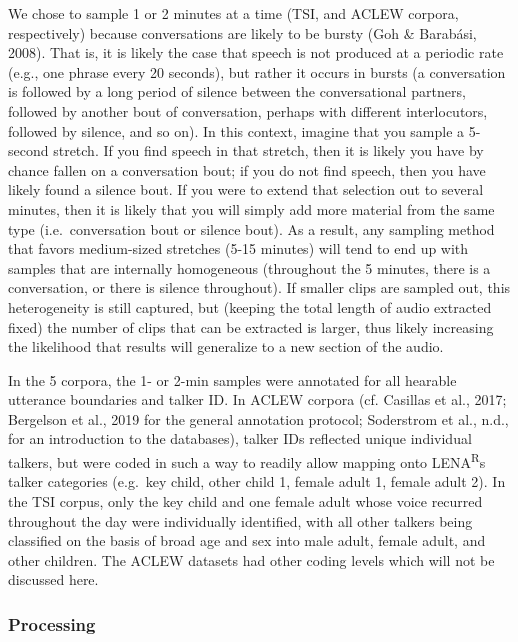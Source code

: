 \documentclass[english,table,man,floatsintext]{apa6}
\begin{document}
We chose to sample 1 or 2 minutes at a time (TSI, and ACLEW corpora, respectively) because conversations are likely to be bursty (Goh \& Barabási, 2008). That is, it is likely the case that speech is not produced at a periodic rate (e.g., one phrase every 20 seconds), but rather it occurs in bursts (a conversation is followed by a long period of silence between the conversational partners, followed by another bout of conversation, perhaps with different interlocutors, followed by silence, and so on). In this context, imagine that you sample a 5-second stretch. If you find speech in that stretch, then it is likely you have by chance fallen on a conversation bout; if you do not find speech, then you have likely found a silence bout. If you were to extend that selection out to several minutes, then it is likely that you will simply add more material from the same type (i.e.~conversation bout or silence bout). As a result, any sampling method that favors medium-sized stretches (5-15 minutes) will tend to end up with samples that are internally homogeneous (throughout the 5 minutes, there is a conversation, or there is silence throughout). If smaller clips are sampled out, this heterogeneity is still captured, but (keeping the total length of audio extracted fixed) the number of clips that can be extracted is larger, thus likely increasing the likelihood that results will generalize to a new section of the audio.

In the 5 corpora, the 1- or 2-min samples were annotated for all hearable utterance boundaries and talker ID. In ACLEW corpora (cf. Casillas et al., 2017; Bergelson et al., 2019 for the general annotation protocol; Soderstrom et al., n.d., for an introduction to the databases),
talker IDs reflected unique individual talkers, but were coded in such a way to readily allow mapping onto LENA\textsuperscript{R}s talker categories (e.g.~key child, other child 1, female adult 1, female adult 2). In the TSI corpus, only the key child and one female adult whose voice recurred throughout the day were individually identified, with all other talkers being classified on the basis of broad age and sex into male adult, female adult, and other children. The ACLEW datasets had other coding levels which will not be discussed here.

\hypertarget{processing}{%
\subsubsection{Processing}\label{processing}}
\end{document}
